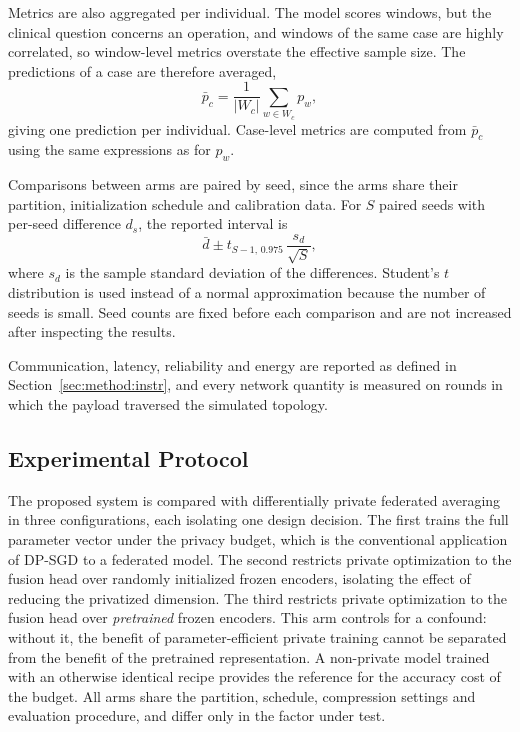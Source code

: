 Metrics are also aggregated per individual. The model scores windows, but the
clinical question concerns an operation, and windows of the same case are
highly correlated, so window-level metrics overstate the effective sample size.
The predictions of a case are therefore averaged,
%
\begin{equation}
\bar{p}_c = \frac{1}{|W_c|} \sum_{w \in W_c} p_w ,
\tag{15}
\label{eq:17}
\end{equation}
%
giving one prediction per individual. Case-level metrics are computed from
$\bar{p}_c$ using the same expressions as for $p_w$.

Comparisons between arms are paired by seed, since the arms share their
partition, initialization schedule and calibration data. For $S$ paired seeds
with per-seed difference $d_s$, the reported interval is
%
\begin{equation}
\bar{d} \pm t_{S-1,\,0.975}\, \frac{s_d}{\sqrt{S}},
\tag{16}
\label{eq:18}
\end{equation}
%
where $s_d$ is the sample standard deviation of the differences. Student's $t$
distribution is used instead of a normal approximation because the number of
seeds is small. Seed counts are fixed before each comparison and are not
increased after inspecting the results.

Communication, latency, reliability and energy are reported as defined in
Section~\ref{sec:method:instr}, and every network quantity is measured on
rounds in which the payload traversed the simulated topology.

\subsection{Experimental Protocol}

The proposed system is compared with differentially private federated
averaging in three configurations, each isolating one design decision. The
first trains the full parameter vector under the privacy budget, which is the
conventional application of DP-SGD to a federated model. The second restricts
private optimization to the fusion head over randomly initialized frozen
encoders, isolating the effect of reducing the privatized dimension. The third
restricts private optimization to the fusion head over \emph{pretrained} frozen
encoders. This arm controls for a confound: without it, the benefit of
parameter-efficient private training cannot be separated from the benefit of
the pretrained representation. A non-private model trained with an otherwise
identical recipe provides the reference for the accuracy cost of the budget.
All arms share the partition, schedule, compression settings and evaluation
procedure, and differ only in the factor under test.

